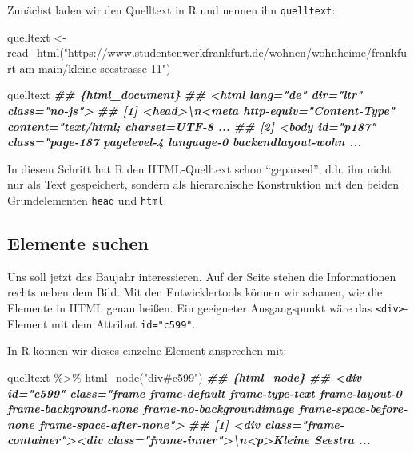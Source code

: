 \documentclass[
  ngerman,
]{article}
\newenvironment{Shaded}{\begin{snugshade}}{\end{snugshade}}
\newcommand{\DocumentationTok}[1]{\textcolor[rgb]{0.56,0.35,0.01}{\textbf{\textit{#1}}}}
\newcommand{\FunctionTok}[1]{\textcolor[rgb]{0.00,0.00,0.00}{#1}}
\newcommand{\NormalTok}[1]{#1}
\newcommand{\OtherTok}[1]{\textcolor[rgb]{0.56,0.35,0.01}{#1}}
\newcommand{\SpecialCharTok}[1]{\textcolor[rgb]{0.00,0.00,0.00}{#1}}
\newcommand{\StringTok}[1]{\textcolor[rgb]{0.31,0.60,0.02}{#1}}
\begin{document}
Zunächst laden wir den Quelltext in R und nennen ihn \texttt{quelltext}:

\begin{Shaded}
\begin{Highlighting}[]
\NormalTok{quelltext }\OtherTok{\textless{}{-}} \FunctionTok{read\_html}\NormalTok{(}\StringTok{"https://www.studentenwerkfrankfurt.de/wohnen/wohnheime/frankfurt{-}am{-}main/kleine{-}seestrasse{-}11"}\NormalTok{)}

\NormalTok{quelltext}
\DocumentationTok{\#\# \{html\_document\}}
\DocumentationTok{\#\# \textless{}html lang="de" dir="ltr" class="no{-}js"\textgreater{}}
\DocumentationTok{\#\# [1] \textless{}head\textgreater{}\textbackslash{}n\textless{}meta http{-}equiv="Content{-}Type" content="text/html; charset=UTF{-}8 ...}
\DocumentationTok{\#\# [2] \textless{}body id="p187" class="page{-}187 pagelevel{-}4 language{-}0 backendlayout{-}wohn ...}
\end{Highlighting}
\end{Shaded}

In diesem Schritt hat R den HTML-Quelltext schon ``geparsed'', d.h. ihn nicht nur als Text gespeichert, sondern als hierarchische Konstruktion mit den beiden Grundelementen \texttt{head} und \texttt{html}.

\hypertarget{elemente-suchen}{%
\subsection{Elemente suchen}\label{elemente-suchen}}

Uns soll jetzt das Baujahr interessieren. Auf der Seite stehen die Informationen rechts neben dem Bild. Mit den Entwicklertools können wir schauen, wie die Elemente in HTML genau heißen. Ein geeigneter Ausgangspunkt wäre das \texttt{\textless{}div\textgreater{}}-Element mit dem Attribut \texttt{id="c599"}.

In R können wir dieses einzelne Element ansprechen mit:

\begin{Shaded}
\begin{Highlighting}[]
\NormalTok{quelltext }\SpecialCharTok{\%\textgreater{}\%}
  \FunctionTok{html\_node}\NormalTok{(}\StringTok{"div\#c599"}\NormalTok{)}
\DocumentationTok{\#\# \{html\_node\}}
\DocumentationTok{\#\# \textless{}div id="c599" class="frame frame{-}default frame{-}type{-}text frame{-}layout{-}0 frame{-}background{-}none frame{-}no{-}backgroundimage frame{-}space{-}before{-}none frame{-}space{-}after{-}none"\textgreater{}}
\DocumentationTok{\#\# [1] \textless{}div class="frame{-}container"\textgreater{}\textless{}div class="frame{-}inner"\textgreater{}\textbackslash{}n\textless{}p\textgreater{}Kleine Seestra ...}
\end{Highlighting}
\end{Shaded}
\end{document}
